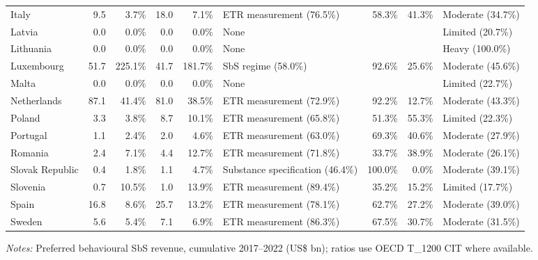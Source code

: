 \begin{table}[H]
\begin{adjustbox}{max width=\textwidth,center}
\begin{tabular}{@{}lrrrrL{2.3cm}rrL{1.6cm}@{}}
Italy &  9.5 &   3.7\% & 18.0 &   7.1\% & ETR measurement (76.5\%) &  58.3\% & 41.3\% & Moderate (34.7\%) \\
Latvia &  0.0 &   0.0\% &  0.0 &   0.0\% & None &  &  & Limited (20.7\%) \\
Lithuania &  0.0 &   0.0\% &  0.0 &   0.0\% & None &  &  & Heavy (100.0\%) \\
Luxembourg & 51.7 & 225.1\% & 41.7 & 181.7\% & SbS regime (58.0\%) &  92.6\% & 25.6\% & Moderate (45.6\%) \\
Malta &  0.0 &   0.0\% &  0.0 &   0.0\% & None &  &  & Limited (22.7\%) \\
Netherlands & 87.1 &  41.4\% & 81.0 &  38.5\% & ETR measurement (72.9\%) &  92.2\% & 12.7\% & Moderate (43.3\%) \\
Poland &  3.3 &   3.8\% &  8.7 &  10.1\% & ETR measurement (65.8\%) &  51.3\% & 55.3\% & Limited (22.3\%) \\
Portugal &  1.1 &   2.4\% &  2.0 &   4.6\% & ETR measurement (63.0\%) &  69.3\% & 40.6\% & Moderate (27.9\%) \\
Romania &  2.4 &   7.1\% &  4.4 &  12.7\% & ETR measurement (71.8\%) &  33.7\% & 38.9\% & Moderate (26.1\%) \\
Slovak Republic &  0.4 &   1.8\% &  1.1 &   4.7\% & Substance specification (46.4\%) & 100.0\% &  0.0\% & Moderate (39.1\%) \\
Slovenia &  0.7 &  10.5\% &  1.0 &  13.9\% & ETR measurement (89.4\%) &  35.2\% & 15.2\% & Limited (17.7\%) \\
Spain & 16.8 &   8.6\% & 25.7 &  13.2\% & ETR measurement (78.1\%) &  62.7\% & 27.2\% & Moderate (39.0\%) \\
Sweden &  5.6 &   5.4\% &  7.1 &   6.9\% & ETR measurement (86.3\%) &  67.5\% & 30.7\% & Moderate (31.5\%) \\
\bottomrule
\end{tabular}
\end{adjustbox}

\vspace{0.35em}
\noindent\begin{minipage}{\textwidth}
\footnotesize\raggedright\textit{Notes:} Preferred behavioural SbS revenue, cumulative 2017--2022 (US\$ bn); ratios use OECD T\_1200 CIT where available.
\end{minipage}
\end{table}
